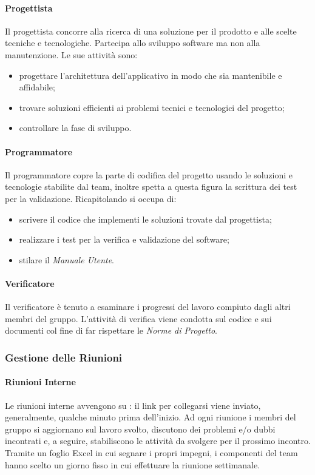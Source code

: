\paragraph{Progettista} \hfill \break
Il progettista concorre alla ricerca di una soluzione per il prodotto e alle scelte tecniche e tecnologiche.
Partecipa allo sviluppo software ma non alla manutenzione. Le sue attività sono:
\begin{itemize}
    \item progettare l'architettura dell'applicativo in modo che sia mantenibile e affidabile;
    \item trovare soluzioni efficienti ai problemi tecnici e tecnologici del progetto;
    \item controllare la fase di sviluppo.
\end{itemize}

\paragraph{Programmatore} \hfill \break
Il programmatore copre la parte di codifica del progetto usando le soluzioni e tecnologie stabilite dal team, inoltre
spetta a questa figura la scrittura dei test per la validazione. Ricapitolando si occupa di:
\begin{itemize}
    \item scrivere il codice che implementi le soluzioni trovate dal progettista;
    \item realizzare i test per la verifica e validazione del software;
    \item stilare il \emph{Manuale Utente}.
\end{itemize}

\paragraph{Verificatore} \hfill \break
Il verificatore è tenuto a esaminare i progressi del lavoro compiuto dagli altri membri del gruppo.   
L'attività di verifica viene condotta sul codice e sui documenti col fine di far rispettare le \emph{Norme di Progetto}.

\subsubsection{Gestione delle Riunioni}
\paragraph{Riunioni Interne} \hfill \break
Le riunioni interne avvengono su : il link per collegarsi viene inviato, generalmente, 
qualche minuto prima dell'inizio. Ad ogni riunione i membri del gruppo si aggiornano sul lavoro svolto, discutono dei problemi e/o dubbi incontrati 
e, a seguire, stabiliscono le attività da svolgere per il prossimo incontro. Tramite un foglio Excel in cui segnare i propri impegni, 
i componenti del team hanno scelto un giorno fisso in cui effettuare la riunione settimanale.

